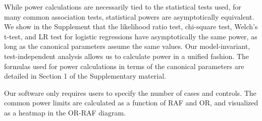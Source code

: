 While power calculations are necessarily tied to the statistical tests used, for many common association tests, statistical powers are asymptotically equivalent.
We show in the Supplement that the likelihood ratio test, chi-square test, Welch's t-test, and LR test for logistic regressions have asymptotically the same power, as long as the canonical parameters assume the same values. 
Our model-invariant, test-independent analysis allows us to calculate power in a unified fashion. 
The formulas used for power calculations in terms of the canonical parameters are detailed in Section 1 of the Supplementary material.

Our software only requires users to specify the number of cases and controls.
The common power limits are calculated as a function of RAF and OR, and visualized as a heatmap in the OR-RAF diagram.


